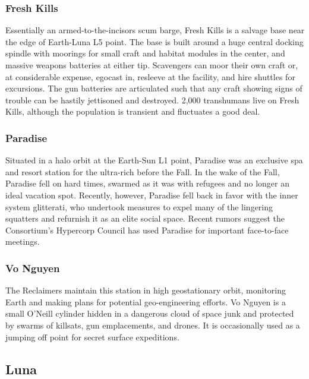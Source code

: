 \subsubsection{Fresh Kills}

Essentially an armed-to-the-incisors scum barge, 
Fresh Kills is a salvage base near the edge of Earth-Luna
L5 point. The base is built around a huge
central docking spindle with moorings for small 
craft and habitat modules in the center, and massive
weapons batteries at either tip. Scavengers can
moor their own craft or, at considerable expense, 
egocast in, resleeve at the facility, and hire shuttles 
for excursions. The gun batteries are articulated such 
that any craft showing signs of trouble can be hastily 
jettisoned and destroyed. 2,000 transhumans live on 
Fresh Kills, although the population is transient and 
fluctuates a good deal.

\subsubsection{Paradise}

Situated in a halo orbit at the Earth-Sun L1 point, 
Paradise was an exclusive spa and resort station 
for the ultra-rich before the Fall. In the wake of the 
Fall, Paradise fell on hard times, swarmed as it was 
with refugees and no longer an ideal vacation spot. 
Recently, however, Paradise fell back in favor with the 
inner system glitterati, who undertook measures to 
expel many of the lingering squatters and refurnish 
it as an elite social space. Recent rumors suggest the 
Consortium's Hypercorp Council has used Paradise 
for important face-to-face meetings.

\subsubsection{Vo Nguyen}

The Reclaimers maintain this station in high geostationary
orbit, monitoring Earth and making plans
for potential geo-engineering efforts. Vo Nguyen is a 
small O'Neill cylinder hidden in a dangerous cloud of 
space junk and protected by swarms of killsats, gun 
emplacements, and drones. It is occasionally used as a 
jumping off point for secret surface expeditions.

\subsection{Luna}

